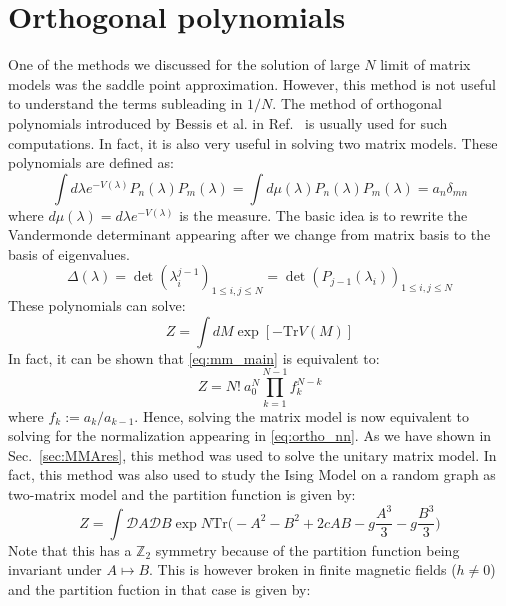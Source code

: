 \documentclass[11pt]{article}
\begin{document}
\section{\label{sec:Ortho_pol1}Orthogonal polynomials}
One of the methods we discussed for the solution of 
large $N$ limit of matrix models was the saddle point approximation. 
However, this method is not useful 
to understand the terms subleading in $1/N$. The method 
of orthogonal polynomials introduced by Bessis et al. in Ref.~\cite{Bessis:1980ss} 
is usually used for such computations. In fact, it is also very useful in 
solving two matrix 
models. These polynomials are defined as:
\begin{equation}
	\label{eq:ortho_nn} 
	\int d\lambda e^{-V(\lambda)} P_{n}(\lambda)
	P_{m}(\lambda) = \int d \mu(\lambda) P_{n}(\lambda)
	P_{m}(\lambda) = a_{n} \delta_{mn} 
\end{equation}
where $d \mu(\lambda) = d\lambda e^{-V(\lambda)}$ is the measure. 
The basic idea is to rewrite the Vandermonde determinant appearing after we change from matrix basis to the basis of eigenvalues. 
\begin{equation}
	\Delta(\lambda) = \det(\lambda_{i}^{j-1})_{1 \le i, j \le N} = \det(P_{j-1}(\lambda_i))_{1 \le i, j \le N}
\end{equation}
These polynomials can solve:
\begin{equation}
	\label{eq:mm_main}
	Z = \int dM \exp[-\mbox{Tr} V(M)] 
\end{equation}
In fact, it can be shown that \ref{eq:mm_main} is equivalent to:
\begin{equation}
\label{eq:ZOP} 
	Z = N! ~ a_{0}^{N} \prod_{k=1}^{N-1} f_{k}^{N-k}
\end{equation}
where $f_{k} := a_{k}/a_{k-1}$. Hence, solving the matrix model is now equivalent to solving for the 
normalization appearing in \ref{eq:ortho_nn}. As we have shown in Sec.~\ref{sec:MMAres}, 
this method was used to solve the unitary 
matrix model. In fact, this method was also used to study the Ising Model on a random graph as two-matrix model 
\cite{Kazakov:1986hu}
and the partition function is given by:
\begin{equation}
	\label{eq:Kaz1} 
	Z = \int \mathcal{D}A \mathcal{D}B \exp N \mbox{Tr} \Bigg(-A^2 -B^2 + 2c AB -g \frac{A^3}{3} - g\frac{B^3}{3}  \Bigg)
\end{equation}
Note that this has a $\mathbb{Z}_{2}$ symmetry because of 
the partition function being invariant under $A \mapsto B$. This is however broken in finite magnetic fields ($h \neq 0$) and the partition fuction in that case is given by:
\end{document}
